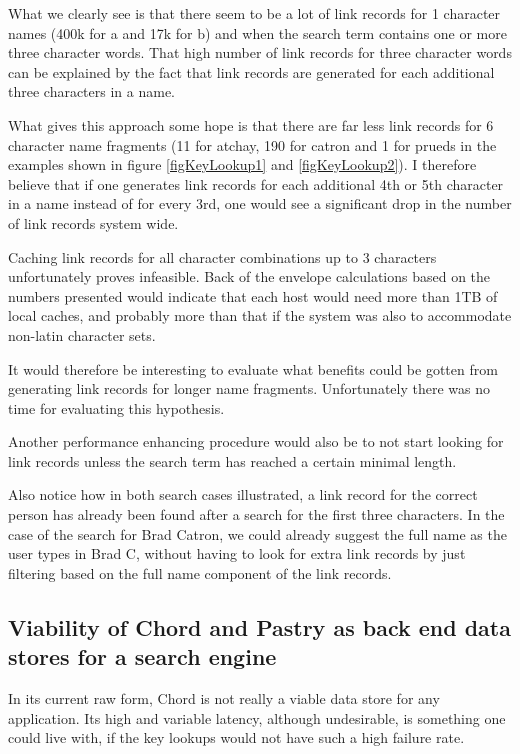 What we clearly see is that there seem to be a lot of link records for 1 character names (400k for a and 17k for b) and when the search term contains one or more three character words. That high number of link records for three character words can be explained by the fact that link records are generated for each additional three characters in a name.

What gives this approach some hope is that there are far less link records for 6 character name fragments (11 for atchay, 190 for catron and 1 for prueds in the examples shown in figure \ref{figKeyLookup1} and \ref{figKeyLookup2}). I therefore believe that if one generates link records for each additional 4th or 5th character in a name instead of for every 3rd, one would see a significant drop in the number of link records system wide.

Caching link records for all character combinations up to 3 characters unfortunately proves infeasible. Back of the envelope calculations based on the numbers presented would indicate that each host would need more than 1TB of local caches, and probably more than that if the system was also to accommodate non-latin character sets.

It would therefore be interesting to evaluate what benefits could be gotten from generating link records for longer name fragments. Unfortunately there was no time for evaluating this hypothesis.

Another performance enhancing procedure would also be to not start looking for link records unless the search term has reached a certain minimal length.

Also notice how in both search cases illustrated, a link record for the correct person has already been found after a search for the first three characters. In the case of the search for Brad Catron, we could already suggest the full name as the user types in Brad C, without having to look for extra link records by just filtering based on the full name component of the link records.


\subsection{Viability of Chord and Pastry as back end data stores for a search engine}
In its current raw form, Chord is not really a viable data store for any application. Its high and variable latency, although undesirable, is something one could live with, if the key lookups would not have such a high failure rate.


